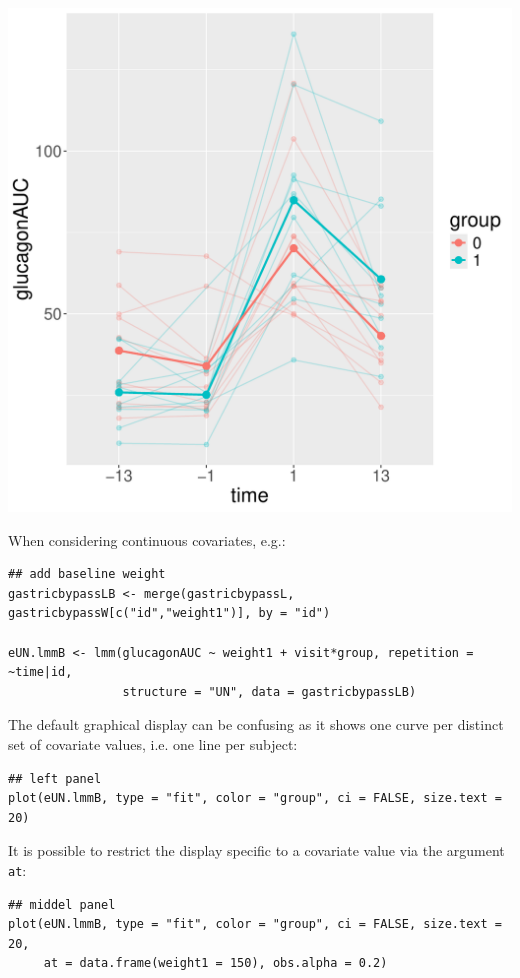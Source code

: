\documentclass[12pt]{article}
\begin{document}
\begin{minipage}{0.3\linewidth}
\begin{center}
\includegraphics[width=\textwidth]{./figures/fitAll-autoplot.pdf}
\end{center}
\end{minipage}


When considering continuous covariates, e.g.:
\lstset{language=r,label= ,caption= ,captionpos=b,numbers=none}
\begin{lstlisting}
## add baseline weight
gastricbypassLB <- merge(gastricbypassL, gastricbypassW[c("id","weight1")], by = "id")

eUN.lmmB <- lmm(glucagonAUC ~ weight1 + visit*group, repetition = ~time|id,
                structure = "UN", data = gastricbypassLB)
\end{lstlisting}


\noindent The default graphical display can be confusing as it shows
one curve per distinct set of covariate values, i.e. one line per
subject:
\lstset{language=r,label= ,caption= ,captionpos=b,numbers=none}
\begin{lstlisting}
## left panel
plot(eUN.lmmB, type = "fit", color = "group", ci = FALSE, size.text = 20)
\end{lstlisting}

It is possible to restrict the display specific to a covariate value
via the argument \texttt{at}:
\lstset{language=r,label= ,caption= ,captionpos=b,numbers=none}
\begin{lstlisting}
## middel panel
plot(eUN.lmmB, type = "fit", color = "group", ci = FALSE, size.text = 20,
     at = data.frame(weight1 = 150), obs.alpha = 0.2)
\end{lstlisting}
\end{document}
